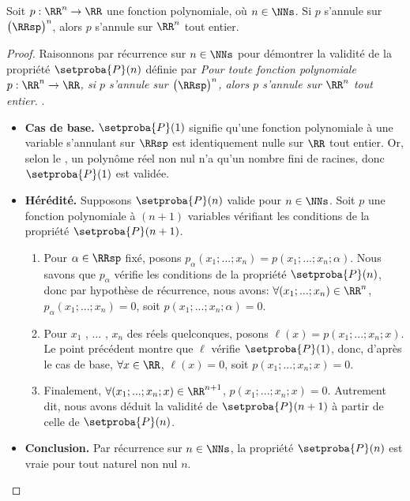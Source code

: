 \begin{fact} \label{poly-nullity-pos}
	Soit $p: \RR^n \rightarrow \RR$ une fonction polynomiale, où $n \in \NNs$.
	Si $p$ s'annule sur $\big( \RRsp \big)^n$, alors $p$ s'annule sur $\RR^n$ tout entier. 
\end{fact}


\begin{proof}
	Raisonnons par récurrence sur $n \in \NNs$ pour démontrer la validité de la propriété $\setproba{P}(n)$ définie par
	\emph{\og 
		Pour toute fonction polynomiale $p: \RR^n \rightarrow \RR$,
		si $p$ s'annule sur $\big( \RRsp \big)^n$,
		alors $p$ s'annule sur $\RR^n$ tout entier. 
	\fg}\kern2pt.
	\begin{itemize}[label=\small\textbullet]
		\item \textbf{Cas de base.}
		$\setproba{P}(1)$ signifie qu'une fonction polynomiale à une variable s'annulant sur $\RRsp$ est identiquement nulle sur $\RR$ tout entier.
		Or, selon le , un polynôme réel non nul n'a qu'un nombre fini de racines, donc $\setproba{P}(1)$ est validée.


		\item \textbf{Hérédité.}
		Supposons $\setproba{P}(n)$ valide pour $n \in \NNs$.
		Soit $p$ une fonction polynomiale à $(n + 1)$ variables vérifiant les conditions de la propriété $\setproba{P}(n + 1)$.
		\begin{enumerate}
		    \item Pour $\alpha \in \RRsp$ fixé,
		    posons $p_\alpha(x_1 ; ... ; x_n) = p(x_1 ; ... ; x_n ; \alpha)$.
		    Nous savons que $p_\alpha$ vérifie les conditions de la propriété $\setproba{P}(n)$,
		    donc par hypothèse de récurrence, nous avons:
		    $\forall (x_1 ; ... ; x_n) \in \RR^n$,
		    $p_\alpha(x_1 ; ... ; x_n) = 0$,
		    soit $p(x_1 ; ... ; x_n ; \alpha) = 0$.


		    \item Pour $x_1$ , ... , $x_n$ des réels quelconques,
		    posons $\ell(x) = p(x_1 ; ... ; x_n ; x)$.
		    Le point précédent montre que $\ell$ vérifie $\setproba{P}(1)$, donc, d'après le cas de base,
		    $\forall x \in \RR$,
		    $\ell(x) = 0$,
		    soit $p(x_1 ; ... ; x_n ; x) = 0$.


		    \item Finalement,
		    $\forall (x_1 ; ... ; x_n ; x) \in \RR^{n+1}$,
		    $p(x_1 ; ... ; x_n ; x) = 0$.
		    Autrement dit, nous avons déduit la validité de $\setproba{P}(n+1)$ à partir de celle de $\setproba{P}(n)$.
		\end{enumerate}
		
		
		\item \textbf{Conclusion.}
		Par récurrence sur $n \in \NNs$, la propriété $\setproba{P}(n)$ est vraie pour tout naturel non nul $n$.
	\end{itemize}

	\null\vspace{-6ex}
\end{proof}



